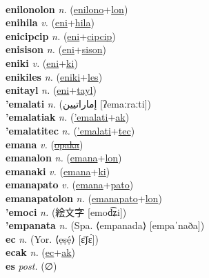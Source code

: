  \label{enilono} \\
\textbf{enilonolon} \textit{n.} (\hyperref[enilono]{enilono}+\hyperref[lon]{lon})
 \label{enilonolon} \\
\textbf{enihila} \textit{v.} (\hyperref[eni]{eni}+\hyperref[hila]{hila})
 \label{enihila} \\
\textbf{enicipcip} \textit{n.} (\hyperref[eni]{eni}+\hyperref[cipcip]{cipcip})
 \label{enicipcip} \\
\textbf{enisison} \textit{n.} (\hyperref[eni]{eni}+\hyperref[sison]{sison})
 \label{enisison} \\
\textbf{eniki} \textit{v.} (\hyperref[eni]{eni}+\hyperref[ki]{ki})
 \label{eniki} \\
\textbf{enikiles} \textit{n.} (\hyperref[eniki]{eniki}+\hyperref[les]{les})
 \label{enikiles} \\
\textbf{enitayl} \textit{n.} (\hyperref[eni]{eni}+\hyperref[tayl]{tayl})
 \label{enitayl} \\
\textbf{'emalati} \textit{n.} ({\arabics{}إماراتيين‎} [ʔemaːraːti])
 \label{'emalati} \\
\textbf{'emalatiak} \textit{n.} (\hyperref['emalati]{'emalati}+\hyperref[ak]{ak})
 \label{'emalatiak} \\
\textbf{'emalatitec} \textit{n.} (\hyperref['emalati]{'emalati}+\hyperref[tec]{tec})
 \label{'emalatitec} \\
\textbf{emana} \textit{v.} (\hyperref[opaka]{\sout{opaka}})
 \label{emana} \\
\textbf{emanalon} \textit{n.} (\hyperref[emana]{emana}+\hyperref[lon]{lon})
 \label{emanalon} \\
\textbf{emanaki} \textit{v.} (\hyperref[emana]{emana}+\hyperref[ki]{ki})
 \label{emanaki} \\
\textbf{emanapato} \textit{v.} (\hyperref[emana]{emana}+\hyperref[pato]{pato})
 \label{emanapato} \\
\textbf{emanapatolon} \textit{n.} (\hyperref[emanapato]{emanapato}+\hyperref[lon]{lon})
 \label{emanapatolon} \\
\textbf{'emoci} \textit{n.} ({\japanese{}絵文字} [emod͡ʑi])
 \label{'emoci} \\
\textbf{'empanata} \textit{n.} (Spa. ⟨empanada⟩ [empaˈnaða])
 \label{'empanata} \\
\textbf{ec} \textit{n.} (Yor. ⟨ẹṣẹ́⟩ [ɛ̄ʃɛ́])
 \label{ec} \\
\textbf{ecak} \textit{n.} (\hyperref[ec]{ec}+\hyperref[ak]{ak})
 \label{ecak} \\
\textbf{es} \textit{post.} (∅)
